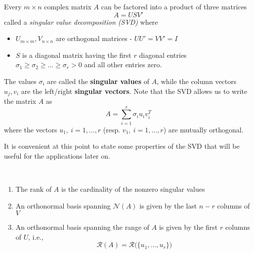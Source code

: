 \documentclass[a4paper,10pt]{article}  %
\begin{document}
\begin{theorem}
   Every $m\times n $ complex matrix $ A $ can be factored into a product of three matrices
   \begin{equation}
      \label{eq:SVD}
      A = U S V'
   \end{equation}
   called a \emph{singular value decomposition (SVD)} where \\[-1.5\baselineskip]
   \begin{itemize}[label=\raisebox{0.25ex}{\tiny $\bullet$ }]
      \item $ U _{m\times m}, V_{n\times n}$ are orthogonal matrices - $ UU' = VV' = I $
      \item $ S $ is a diagonal matrix having the first $r$ diagonal entries $ \sigma_1 \ge \sigma_2 \ge \ldots \ge \sigma_{r} > 0$
      and all other entries zero. \\[-1.5\baselineskip]
   \end{itemize}
   The values $ \sigma_i $ are called the \textbf{singular values} of $ A $, while the column vectors $ u_j,v_i $ are
   the left/right \textbf{singular vectors}. Note that the SVD allows us to write the matrix $ A $ as 
   \[
      A = \sum_{i=1}^r \sigma_i u_i v_i^T
   \]
   where the vectors $ u_1, \ i=1,\ldots,r $ (resp. $ v_1, \ i=1,\ldots,r $) are mutually orthogonal. 
\end{theorem}
It is convenient at this point to state  some properties of the SVD that will be useful for the applications later on. 
\pagebreak 

\begin{claim} \ \\[-1.5\baselineskip]
   \begin{enumerate}
      \item The rank of $ A $ is the cardinality of the nonzero singular values
      \item An orthonormal basis spanning $ \mathcal{N}(A) $ is given by the last $ n-r $ columns of $ V $
      \item An orthonormal basis spanning the range of $ A $ is given by the first $ r $ columns of $ U $, i.e., 
      \[
         \mathcal{R}(A) = \mathcal{R} \big(  \{ u_1, \ldots, u_r \}  \big)
      \]
   \end{enumerate}
\end{claim}


\end{document}
